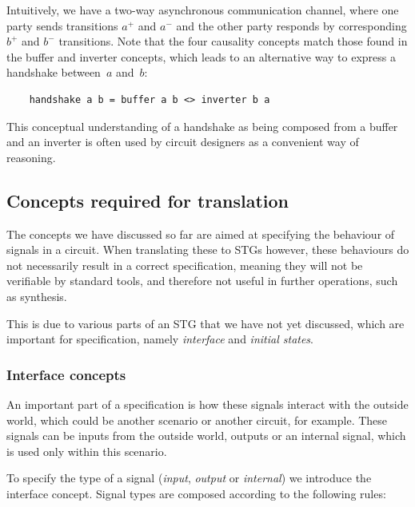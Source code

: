 \documentclass[british,conference,compsoc]{IEEEtran}
\begin{document}
Intuitively, we have a two-way asynchronous communication channel,
where one party sends transitions $a^{+}$ and $a^{-}$ and the other
party responds by corresponding $b^{+}$ and $b^{-}$ transitions.
Note that the four causality concepts match those found
in the buffer and inverter concepts, which leads to an alternative
way to express a handshake between~$a$ and~$b$:

\begin{lstlisting}
    handshake a b = buffer a b <> inverter b a
\end{lstlisting}

This conceptual understanding of a handshake as being composed
from a buffer and an inverter is often used by circuit designers as
a convenient way of reasoning.

\vspace{-2mm}

\subsection{Concepts required for translation\label{sub:trans-concepts}}

\vspace{-2mm}

The concepts we have discussed so far are aimed at specifying the behaviour of 
signals in a circuit. When translating these to STGs however, these behaviours 
do not necessarily result in a correct specification, meaning they will not be 
verifiable by standard tools, and therefore not useful in further operations, 
such as synthesis.

This is due to various parts of an STG that we have not yet discussed, which 
are important for specification, namely \emph{interface} and 
\emph{initial states}.

\vspace{-3mm}

\subsubsection{Interface concepts\label{sub:interface}} 

An important part of a specification is how these signals interact with the 
outside world, which could be another scenario or another circuit, for example.
These signals can be inputs from the outside world, outputs or an internal 
signal, which is used only within this scenario. 

To specify the type of a signal (\emph{input},
\emph{output} or \emph{internal}) we introduce the \textsf{interface} concept.
Signal types are composed according to the following rules:
\end{document}
